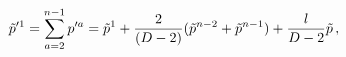 \begin{equation}
 \tilde p^{\prime 1} =\sum_{a=2}^{n-1} p^{\prime a}=  \tilde p^1+{2\over (D-2)}(
\tilde p^{n-2}+ \tilde p^{n-1}) +{l\over D-2} \tilde p
\, ,
\end{equation} 
